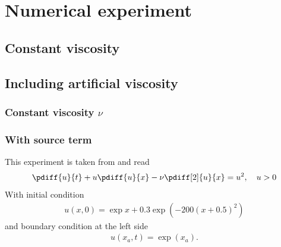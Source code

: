 \chapter{Numerical experiment}
\section{Constant viscosity}
\section{Including artificial viscosity}
\subsection{Constant viscosity $\nu$}
\subsection{With source term}
This experiment is taken from \citet{Colombo2026} and read
\begin{align}
    \pdiff{u}{t} + u \pdiff{u}{x} - \nu \pdiff[2]{u}{x}= u^2, \quad u >0
\end{align}
With initial condition
\begin{align}
u(x,0) = \exp{x} + 0.3 \exp( -200 (x + 0.5)^2)
\end{align}
and boundary condition at the left side
\begin{align}
    u(x_a,t) = \exp(x_a).
\end{align}
